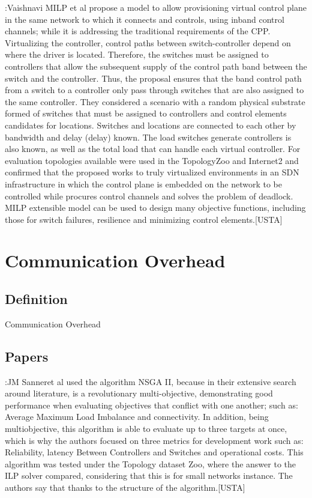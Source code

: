 \documentclass[a4paper,10pt]{article}
\begin{document}
\cite{VaPo17}:Vaishnavi MILP et al propose a model to allow provisioning virtual control plane in the same network to which it connects and controls, using inband control channels; while it is addressing the traditional requirements of the CPP. Virtualizing the controller, control paths between switch-controller depend on where the driver is located. Therefore, the switches must be assigned to controllers that allow the subsequent supply of the control path band between the switch and the controller. Thus, the proposal ensures that the band control path from a switch to a controller only pass through switches that are also assigned to the same controller.
They considered a scenario with a random physical substrate formed of switches that must be assigned to controllers and control elements candidates for locations. Switches and locations are connected to each other by bandwidth and delay (delay) known. The load switches generate controllers is also known, as well as the total load that can handle each virtual controller.
For evaluation topologies available were used in the TopologyZoo and Internet2 and confirmed that the proposed works to truly virtualized environments in an SDN infrastructure in which the control plane is embedded on the network to be controlled while procures control channels and solves the problem of deadlock. MILP extensible model can be used to design many objective functions, including those for switch failures, resilience and minimizing control elements.[USTA]


\section{Communication Overhead}
\subsection{Definition}
Communication Overhead

\subsection{Papers}
\cite{LiYo16}:JM Sanneret al used the algorithm NSGA II, because in their extensive search around literature, is a revolutionary multi-objective, demonstrating good performance when evaluating objectives that conflict with one another; such as: Average Maximum Load Imbalance and connectivity. In addition, being multiobjective, this algorithm is able to evaluate up to three targets at once, which is why the authors focused on three metrics for development work such as: Reliability, latency Between Controllers and Switches and operational costs. This algorithm was tested under the Topology dataset Zoo, where the answer to the ILP solver compared, considering that this is for small networks instance. The authors say that thanks to the structure of the algorithm.[USTA]
\end{document}
